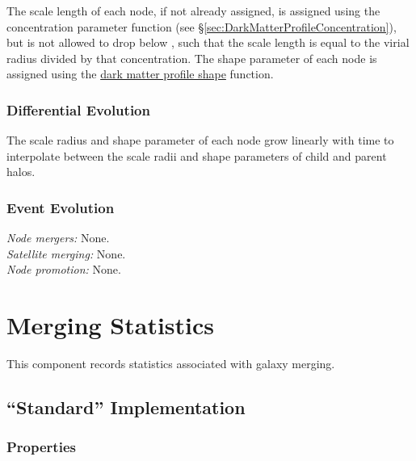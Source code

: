 The scale length of each node, if not already assigned, is assigned using the concentration parameter function (see \S\ref{sec:DarkMatterProfileConcentration}), but is not allowed to drop below {\normalfont \ttfamily [darkMatterProfileMinimumConcentration]}, such that the scale length is equal to the virial radius divided by that concentration. The shape parameter of each \gls{node} is assigned using the \href{https://github.com/galacticusorg/galacticus/releases/download/masterRelease/Galacticus_Development.pdf\#methods.darkMatterProfileShape}{dark matter profile shape} function.

\subsubsection{Differential Evolution}

The scale radius and shape parameter of each node grow linearly with time to interpolate between the scale radii and shape parameters of child and parent halos.

\subsubsection{Event Evolution}

\noindent\emph{Node mergers:} None.\\

\noindent\emph{Satellite merging:} None.\\

\noindent\emph{Node promotion:} None.\\


\section{Merging Statistics}

This \gls{component} records statistics associated with galaxy merging.

\subsection{``Standard'' Implementation}

\subsubsection{Properties}

